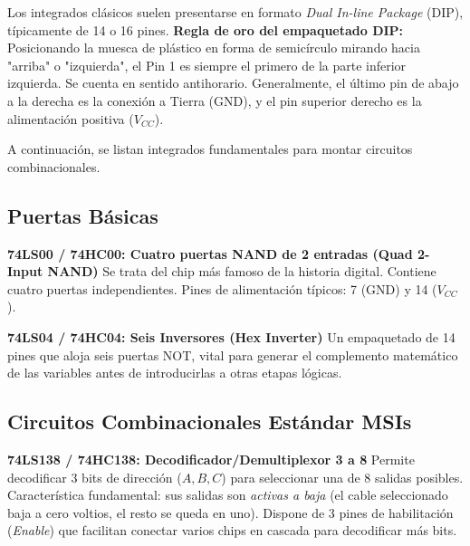 Los integrados clásicos suelen presentarse en formato \textit{Dual In-line Package} (DIP), típicamente de 14 o 16 pines.
\textbf{Regla de oro del empaquetado DIP:} Posicionando la muesca de plástico en forma de semicírculo mirando hacia "arriba" o "izquierda", el Pin 1 es siempre el primero de la parte inferior izquierda. Se cuenta en sentido antihorario. Generalmente, el último pin de abajo a la derecha es la conexión a Tierra (GND), y el pin superior derecho es la alimentación positiva ($V_{CC}$).

A continuación, se listan integrados fundamentales para montar circuitos combinacionales.

\subsection{Puertas Básicas}

\textbf{74LS00 / 74HC00: Cuatro puertas NAND de 2 entradas (Quad 2-Input NAND)}
Se trata del chip más famoso de la historia digital. Contiene cuatro puertas independientes. Pines de alimentación típicos: 7 (GND) y 14 ($V_{CC}$).

\textbf{74LS04 / 74HC04: Seis Inversores (Hex Inverter)}
Un empaquetado de 14 pines que aloja seis puertas NOT, vital para generar el complemento matemático de las variables antes de introducirlas a otras etapas lógicas.

\subsection{Circuitos Combinacionales Estándar MSIs}

\textbf{74LS138 / 74HC138: Decodificador/Demultiplexor 3 a 8}
Permite decodificar 3 bits de dirección ($A, B, C$) para seleccionar una de 8 salidas posibles. Característica fundamental: sus salidas son \textit{activas a baja} (el cable seleccionado baja a cero voltios, el resto se queda en uno). Dispone de 3 pines de habilitación (\textit{Enable}) que facilitan conectar varios chips en cascada para decodificar más bits.

